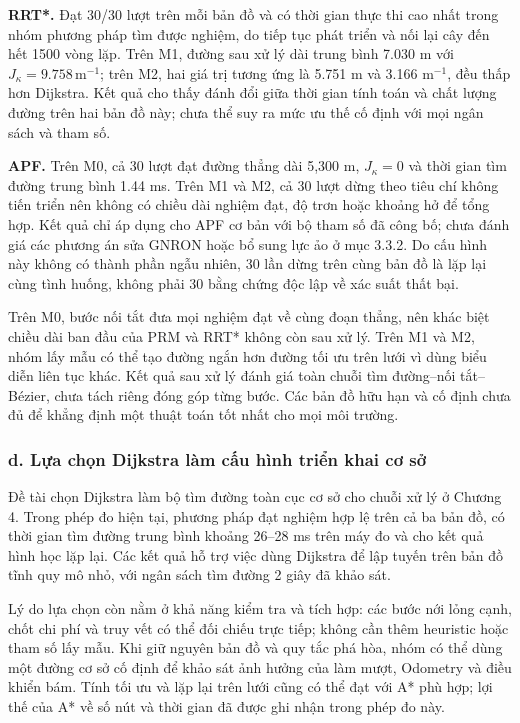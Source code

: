 \noindent\textbf{RRT*.} Đạt 30/30 lượt trên mỗi bản đồ và có thời gian thực thi cao nhất trong nhóm phương pháp tìm được nghiệm, do tiếp tục phát triển và nối lại cây đến hết 1500 vòng lặp. Trên M1, đường sau xử lý dài trung bình 7.030 m với \(J_\kappa=9.758\,\mathrm{m}^{-1}\); trên M2, hai giá trị tương ứng là 5.751 m và 3.166 \(\mathrm{m}^{-1}\), đều thấp hơn Dijkstra. Kết quả cho thấy đánh đổi giữa thời gian tính toán và chất lượng đường trên hai bản đồ này; chưa thể suy ra mức ưu thế cố định với mọi ngân sách và tham số.

\noindent\textbf{APF.} Trên M0, cả 30 lượt đạt đường thẳng dài 5,300 m, \(J_\kappa=0\) và thời gian tìm đường trung bình 1.44 ms. Trên M1 và M2, cả 30 lượt dừng theo tiêu chí không tiến triển nên không có chiều dài nghiệm đạt, độ trơn hoặc khoảng hở để tổng hợp. Kết quả chỉ áp dụng cho APF cơ bản với bộ tham số đã công bố; chưa đánh giá các phương án sửa GNRON hoặc bổ sung lực ảo ở mục 3.3.2. Do cấu hình này không có thành phần ngẫu nhiên, 30 lần dừng trên cùng bản đồ là lặp lại cùng tình huống, không phải 30 bằng chứng độc lập về xác suất thất bại.

Trên M0, bước nối tắt đưa mọi nghiệm đạt về cùng đoạn thẳng, nên khác biệt chiều dài ban đầu của PRM và RRT* không còn sau xử lý. Trên M1 và M2, nhóm lấy mẫu có thể tạo đường ngắn hơn đường tối ưu trên lưới vì dùng biểu diễn liên tục khác. Kết quả sau xử lý đánh giá toàn chuỗi tìm đường--nối tắt--Bézier, chưa tách riêng đóng góp từng bước. Các bản đồ hữu hạn và cố định chưa đủ để khẳng định một thuật toán tốt nhất cho mọi môi trường.

\subsubsection*{d. Lựa chọn Dijkstra làm cấu hình triển khai cơ sở}

Đề tài chọn Dijkstra làm bộ tìm đường toàn cục cơ sở cho chuỗi xử lý ở Chương 4. Trong phép đo hiện tại, phương pháp đạt nghiệm hợp lệ trên cả ba bản đồ, có thời gian tìm đường trung bình khoảng 26--28 ms trên máy đo và cho kết quả hình học lặp lại. Các kết quả hỗ trợ việc dùng Dijkstra để lập tuyến trên bản đồ tĩnh quy mô nhỏ, với ngân sách tìm đường 2 giây đã khảo sát.

Lý do lựa chọn còn nằm ở khả năng kiểm tra và tích hợp: các bước nới lỏng cạnh, chốt chi phí và truy vết có thể đối chiếu trực tiếp; không cần thêm heuristic hoặc tham số lấy mẫu. Khi giữ nguyên bản đồ và quy tắc phá hòa, nhóm có thể dùng một đường cơ sở cố định để khảo sát ảnh hưởng của làm mượt, Odometry và điều khiển bám. Tính tối ưu và lặp lại trên lưới cũng có thể đạt với A* phù hợp; lợi thế của A* về số nút và thời gian đã được ghi nhận trong phép đo này.


